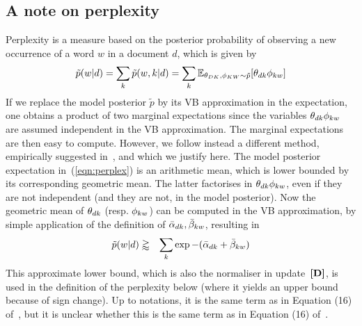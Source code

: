 \subsection{A note on perplexity}
Perplexity is a measure based on the posterior probability of observing a new occurrence of a word $w$ in a document $d$, which is given by
\begin{equation}
\label{eqn:perplex}
\tilde{p}(w|d) =
\sum_k\tilde{p}(w,k|d) =
\sum_k\mathbb{E}_{\theta_{DK},\phi_{KW}\sim\tilde{p}}[\theta_{dk}\phi_{kw}]
\end{equation}
If we replace the model posterior $\tilde{p}$ by its VB approximation in the expectation, one obtains a product of two marginal expectations since the variables $\theta_{dk}\phi_{kw}$ are assumed independent in the VB approximation. The marginal expectations are then easy to compute. However, we follow instead a different method, empirically suggested in~\cite{asuncion_smoothing_2009}, and which we justify here. The model posterior expectation in~(\ref{eqn:perplex}) is an arithmetic mean, which is lower bounded by its corresponding geometric mean. The latter factorises in $\theta_{dk}\phi_{kw}$, even if they are not independent (and they are not, in the model posterior). Now the geometric mean of $\theta_{dk}$ (resp. $\phi_{kw}$) can be computed in the VB approximation, by simple application of the definition of $\bar{\alpha}_{dk},\bar{\beta}_{kw}$, resulting in
\begin{eqnarray}
\label{eqn:perplex-bound}
\tilde{p}(w|d) & \gtrapprox & \sum_k\exp-(\bar{\alpha}_{dk}+\bar{\beta}_{kw})
\end{eqnarray}
This approximate lower bound, which is also the normaliser in update~$\textbf{[D]}$, is used in the definition of the perplexity below (where it yields an upper bound because of sign change). Up to notations, it is the same term as in Equation (16) of~\cite{asuncion_smoothing_2009}, but it is unclear whether this is the same term as in Equation (16) of~\cite{hoffman_online_2010}.
